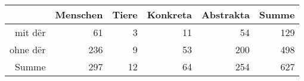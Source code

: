 \begin{tabular}{rrrrrr}
  \hline
 & Menschen & Tiere & Konkreta & Abstrakta & Summe \\ 
  \hline
mit dër & 61 & 3 & 11 & 54 & 129 \\ 
  ohne dër & 236 & 9 & 53 & 200 & 498 \\ 
  Summe & 297 & 12 & 64 & 254 & 627 \\ 
   \hline
\end{tabular}
